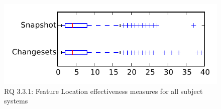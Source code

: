 
\begin{figure}
\centering
\includegraphics[height=0.4\textheight]{figures/flt/rq1_tiny}
\caption{RQ 3.3.1: Feature Location effectiveness measures for all subject systems}
\label{fig:flt:rq1:tiny}
\end{figure}
